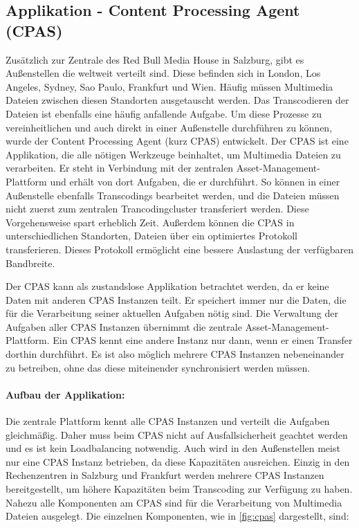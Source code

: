 \subsection{Applikation - Content Processing Agent (CPAS)}
\label{sec:cpas}
Zusätzlich zur Zentrale des Red Bull Media House in Salzburg, gibt es Außenstellen die weltweit verteilt sind. Diese befinden sich in London, Los Angeles, Sydney, Sao Paulo, Frankfurt und Wien. Häufig müssen Multimedia Dateien zwischen diesen Standorten ausgetauscht werden. Das Transcodieren der Dateien ist ebenfalls eine häufig anfallende Aufgabe. Um diese Prozesse zu vereinheitlichen und auch direkt in einer Außenstelle durchführen zu können, wurde der Content Processing Agent (kurz CPAS) entwickelt. Der CPAS ist eine Applikation, die alle nötigen Werkzeuge beinhaltet, um Multimedia Dateien zu verarbeiten. Er steht in Verbindung mit der zentralen Asset-Management-Plattform und erhält von dort Aufgaben, die er durchführt. So können in einer Außenstelle ebenfalls Transcodings bearbeitet werden, und die Dateien müssen nicht zuerst zum zentralen Trancodingcluster transferiert werden. Diese Vorgehensweise spart erheblich Zeit. Außerdem können die CPAS in unterschiedlichen Standorten, Dateien über ein optimiertes Protokoll transferieren. Dieses Protokoll ermöglicht eine bessere Auslastung der verfügbaren Bandbreite. 

Der CPAS kann als zustandslose Applikation betrachtet werden, da er keine Daten mit anderen CPAS Instanzen teilt. Er speichert immer nur die Daten, die für die Verarbeitung seiner aktuellen Aufgaben nötig sind. Die Verwaltung der Aufgaben aller CPAS Instanzen übernimmt die zentrale Asset-Management-Plattform. Ein CPAS kennt eine andere Instanz nur dann, wenn er einen Transfer dorthin durchführt. Es ist also möglich mehrere CPAS Instanzen nebeneinander zu betreiben, ohne das diese miteinender synchronisiert werden müssen.

\paragraph{Aufbau der Applikation:}
Die zentrale Plattform kennt alle CPAS Instanzen und verteilt die Aufgaben gleichmäßig. Daher muss beim CPAS nicht auf Ausfallsicherheit geachtet werden und es ist kein Loadbalancing notwendig. Auch wird in den Außenstellen meist nur eine CPAS Instanz betrieben, da diese Kapazitäten ausreichen. Einzig in den Rechenzentren in Salzburg und Frankfurt werden mehrere CPAS Instanzen bereitgestellt, um höhere Kapazitäten beim Transcoding zur Verfügung zu haben. Nahezu alle Komponenten am CPAS sind für die Verarbeitung von Multimedia Dateien ausgelegt. Die einzelnen Komponenten, wie in \autoref{fig:cpas} dargestellt, sind:

